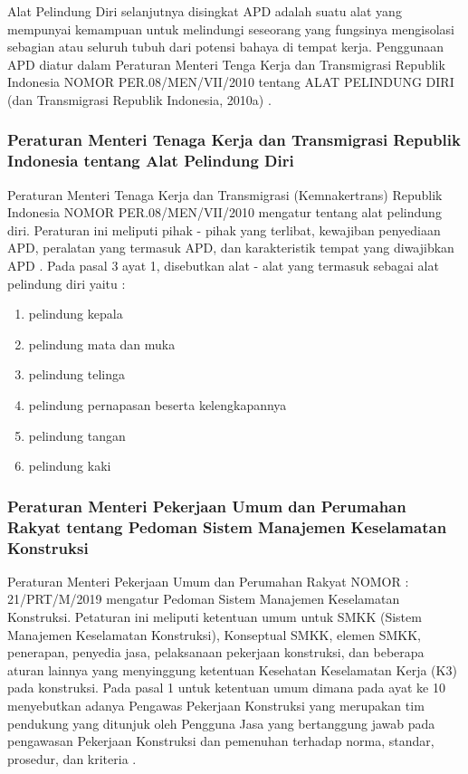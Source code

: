 Alat Pelindung Diri selanjutnya disingkat APD adalah
suatu alat yang mempunyai kemampuan untuk melindungi
seseorang yang fungsinya mengisolasi sebagian atau
seluruh tubuh dari potensi bahaya di tempat kerja.
Penggunaan APD diatur dalam Peraturan Menteri Tenga Kerja
dan Transmigrasi Republik Indonesia NOMOR PER.08/MEN/VII/2010
tentang ALAT PELINDUNG DIRI (dan Transmigrasi Republik Indonesia, 2010a) \cite{suratkementriantenagakerja}.

\newpage

\subsubsection{Peraturan Menteri Tenaga Kerja dan Transmigrasi Republik Indonesia tentang Alat Pelindung Diri}
\label{peraturanapd}

Peraturan Menteri Tenaga Kerja dan Transmigrasi (Kemnakertrans) Republik Indonesia NOMOR PER.08/MEN/VII/2010 mengatur tentang alat pelindung diri.
Peraturan ini meliputi pihak - pihak yang terlibat, kewajiban penyediaan APD, peralatan yang termasuk APD, dan karakteristik tempat
yang diwajibkan APD \cite{suratkementriantenagakerja}. Pada pasal 3 ayat 1, disebutkan alat - alat yang termasuk sebagai alat pelindung diri
yaitu :

\begin{enumerate}[nolistsep]
  \item pelindung kepala
  \item pelindung mata dan muka
  \item pelindung telinga
  \item pelindung pernapasan beserta kelengkapannya
  \item pelindung tangan
  \item pelindung kaki
\end{enumerate}

\subsubsection{Peraturan Menteri Pekerjaan Umum dan Perumahan Rakyat tentang Pedoman Sistem Manajemen Keselamatan Konstruksi}
\label{sec:permenpu_smkk}

\par Peraturan Menteri Pekerjaan Umum dan Perumahan Rakyat NOMOR : 21/PRT/M/2019 mengatur Pedoman Sistem Manajemen Keselamatan Konstruksi.
Petaturan ini meliputi ketentuan umum untuk SMKK (Sistem Manajemen Keselamatan Konstruksi), Konseptual SMKK, elemen SMKK, penerapan, penyedia jasa, pelaksanaan pekerjaan konstruksi,  dan beberapa aturan lainnya yang menyinggung ketentuan Kesehatan Keselamatan Kerja (K3) pada konstruksi. Pada pasal 1 untuk ketentuan umum dimana pada ayat ke 10 menyebutkan adanya Pengawas Pekerjaan Konstruksi yang merupakan tim pendukung yang ditunjuk oleh Pengguna Jasa yang bertanggung jawab pada pengawasan Pekerjaan Konstruksi dan pemenuhan terhadap norma, standar, prosedur, dan kriteria \cite{permen21prtm2019pedomansistemmanajemenkeselamatankonstruksi}.


